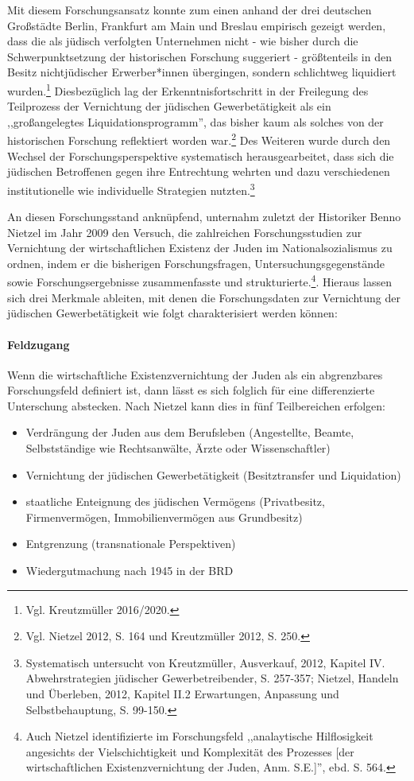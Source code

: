 Mit diesem Forschungsansatz konnte zum einen anhand der drei deutschen Großstädte Berlin, Frankfurt am Main und Breslau empirisch  gezeigt werden, dass die als jüdisch verfolgten Unternehmen nicht - wie bisher durch die Schwerpunktsetzung der historischen Forschung suggeriert - größtenteils in den Besitz nichtjüdischer Erwerber*innen übergingen, sondern schlichtweg liquidiert wurden.\footnote{Vgl. Kreutzmüller 2016/2020.} Diesbezüglich lag der Erkenntnisfortschritt in der Freilegung des Teilprozess der Vernichtung der jüdischen Gewerbetätigkeit als ein ,,großangelegtes Liquidationsprogramm'', das bisher kaum als solches von der historischen Forschung reflektiert worden war.\footnote{Vgl. Nietzel 2012, S. 164 und Kreutzmüller 2012, S. 250.} Des Weiteren wurde durch den Wechsel der Forschungsperspektive systematisch herausgearbeitet, dass sich die jüdischen Betroffenen gegen ihre Entrechtung wehrten und dazu verschiedenen institutionelle wie individuelle Strategien nutzten.\footnote{Systematisch untersucht von Kreutzmüller, Ausverkauf, 2012, Kapitel IV. Abwehrstrategien jüdischer Gewerbetreibender, S. 257-357; Nietzel, Handeln und Überleben, 2012, Kapitel II.2 Erwartungen, Anpassung und Selbstbehauptung, S. 99-150.}

An diesen Forschungsstand anknüpfend, unternahm zuletzt der Historiker Benno Nietzel im Jahr 2009 den Versuch, die zahlreichen Forschungsstudien zur Vernichtung der wirtschaftlichen Existenz der Juden im Nationalsozialismus zu ordnen, indem er die bisherigen Forschungsfragen, Untersuchungsgegenstände sowie Forschungsergebnisse zusammenfasste und strukturierte.\footnote{Auch Nietzel identifizierte im Forschungsfeld ,,analaytische Hilflosigkeit angesichts der Vielschichtigkeit und Komplexität des Prozesses [der wirtschaftlichen Existenzvernichtung der Juden, Anm. S.E.]'', ebd. S. 564.}. Hieraus lassen sich drei Merkmale ableiten, mit denen die Forschungsdaten zur Vernichtung der jüdischen Gewerbetätigkeit wie folgt charakterisiert werden können:

\paragraph{Feldzugang}Wenn die wirtschaftliche Existenzvernichtung der Juden als ein abgrenzbares Forschungsfeld definiert ist, dann lässt es sich folglich für eine differenzierte Unterschung abstecken. Nach Nietzel kann dies in fünf Teilbereichen erfolgen:
\begin{itemize}
\item Verdrängung der Juden aus dem Berufsleben (Angestellte, Beamte, Selbstständige wie Rechtsanwälte, Ärzte oder Wissenschaftler)
\item Vernichtung der jüdischen Gewerbetätigkeit (Besitztransfer und Liquidation)
\item staatliche Enteignung des jüdischen Vermögens (Privatbesitz, Firmenvermögen, Immobilienvermögen aus Grundbesitz) 
\item Entgrenzung (transnationale Perspektiven)
\item Wiedergutmachung nach 1945 in der BRD
\end{itemize}


